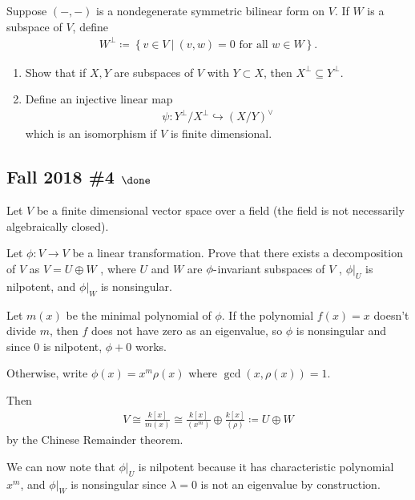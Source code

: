 Suppose \(({-}, {-})\) is a nondegenerate symmetric bilinear form on
\(V\). If \(W\) is a subspace of \(V\), define
\begin{align*}
W^{\perp} \coloneqq\left\{{v\in V {~\mathrel{\Big|}~}(v, w) = 0 \text{ for all } w\in W}\right\}
.\end{align*}

\begin{enumerate}
\def\labelenumi{\alph{enumi}.}
\item
  Show that if \(X, Y\) are subspaces of \(V\) with \(Y\subset X\), then
  \(X^{\perp} \subseteq Y^{\perp}\).
\item
  Define an injective linear map
  \begin{align*}
  \psi: Y^{\perp}/X^{\perp} \hookrightarrow(X/Y)^\vee
  \end{align*}
  which is an isomorphism if \(V\) is finite dimensional.
\end{enumerate}

\hypertarget{fall-2018-4-done}{%
\subsection{\texorpdfstring{Fall 2018 \#4
\(\done\)}{Fall 2018 \#4 \textbackslash done}}\label{fall-2018-4-done}}

Let \(V\) be a finite dimensional vector space over a field (the field
is not necessarily algebraically closed).

Let \(\phi : V \to V\) be a linear transformation. Prove that there
exists a decomposition of \(V\) as \(V = U \oplus W\) , where \(U\) and
\(W\) are \(\phi{\hbox{-}}\)invariant subspaces of \(V\) ,
\({\left.{{\phi}} \right|_{{U}} }\) is nilpotent, and
\({\left.{{\phi}} \right|_{{W}} }\) is nonsingular.


\begin{solution}

Let \(m(x)\) be the minimal polynomial of \(\phi\). If the polynomial
\(f(x) = x\) doesn't divide \(m\), then \(f\) does not have zero as an
eigenvalue, so \(\phi\) is nonsingular and since \(0\) is nilpotent,
\(\phi + 0\) works.

Otherwise, write \(\phi(x) = x^m \rho(x)\) where
\(\gcd(x, \rho(x)) = 1\).

Then
\begin{align*}
V \cong \frac{k[x]}{m(x)} \cong \frac{k[x]}{(x^m)} \oplus \frac{k[x]}{(\rho)}
\coloneqq U \oplus W
\end{align*}
by the Chinese Remainder theorem.

We can now note that \({\left.{{\phi}} \right|_{{U}} }\) is nilpotent
because it has characteristic polynomial \(x^m\), and
\({\left.{{\phi}} \right|_{{W}} }\) is nonsingular since \(\lambda = 0\)
is not an eigenvalue by construction.

\end{solution}

